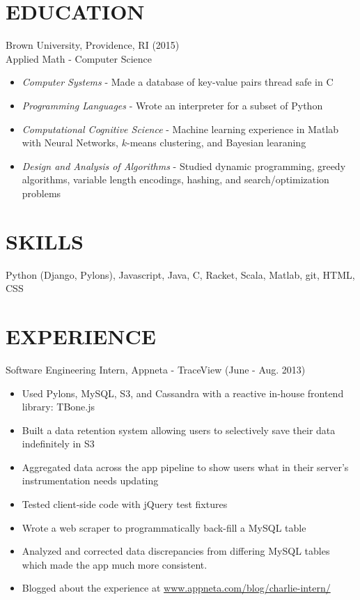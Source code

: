 \documentclass[11pt]{res} %
\begin{document}
\begin{resume}

\section{EDUCATION}
Brown University, Providence, RI (2015) \\
Applied Math - Computer Science
\begin{itemize} \itemsep -2pt
  \item \emph{Computer Systems} - Made a database of key-value pairs thread safe in C
  \item \emph{Programming Languages} - Wrote an interpreter for a subset of Python
  \item \emph{Computational Cognitive Science} - Machine learning experience in Matlab with Neural Networks, $k$-means clustering, and Bayesian learaning
  \item \emph{Design and Analysis of Algorithms} - Studied dynamic programming, greedy algorithms, variable length encodings, hashing,  and search/optimization problems
\end{itemize}

 \section{SKILLS}
  Python (Django, Pylons), Javascript, Java, C, Racket, Scala, Matlab, git, HTML, CSS

\section{EXPERIENCE}
Software Engineering Intern, 
Appneta - TraceView 
(June - Aug. 2013)
\vspace{0.02in}
   \begin{itemize} \itemsep -2pt
   \item Used Pylons, MySQL, S3, and Cassandra with a reactive in-house frontend library: TBone.js
   \item Built a data retention system allowing users to selectively save their data indefinitely in S3
   \item Aggregated data across the app pipeline to show users what in their server's instrumentation needs updating 
   \item Tested client-side code with jQuery test fixtures
   \item Wrote a web scraper to programmatically back-fill a MySQL table
   \item Analyzed and corrected data discrepancies from differing MySQL tables which made the app much more consistent.
   \item Blogged about the experience at \href{http://www.appneta.com/blog/charlie-intern/}{www.appneta.com/blog/charlie-intern/}
   \end{itemize}


\end{resume}
\end{document}
